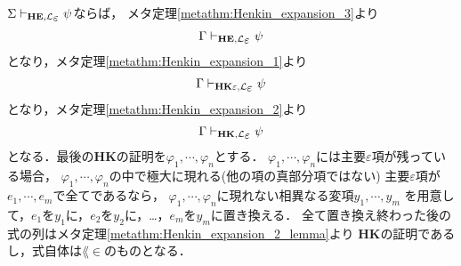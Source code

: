 	\begin{sketch}
		$\Sigma \provable{\mbox{{\bf HE}},\lang{\varepsilon}} \psi$ならば，
		メタ定理\ref{metathm:Henkin_expansion_3}より
		\begin{align}
			\Gamma \provable{\mbox{{\bf HE}},\lang{\varepsilon}} \psi
		\end{align}
		となり，メタ定理\ref{metathm:Henkin_expansion_1}より
		\begin{align}
			\Gamma \provable{\mbox{{\bf HK$\varepsilon$}},\lang{\varepsilon}} \psi
		\end{align}
		となり，メタ定理\ref{metathm:Henkin_expansion_2}より
		\begin{align}
			\Gamma \provable{\mbox{{\bf HK}},\lang{\varepsilon}} \psi
		\end{align}
		となる．最後の{\bf HK}の証明を$\varphi_{1},\cdots,\varphi_{n}$とする．
		$\varphi_{1},\cdots,\varphi_{n}$には主要$\varepsilon$項が残っている場合，
		$\varphi_{1},\cdots,\varphi_{n}$の中で極大に現れる(他の項の真部分項ではない)
		主要$\varepsilon$項が$e_{1},\cdots,e_{m}$で全てであるなら，
		$\varphi_{1},\cdots,\varphi_{n}$に現れない相異なる変項$y_{1},\cdots,y_{m}$
		を用意して，$e_{1}$を$y_{1}$に，$e_{2}$を$y_{2}$に，…，$e_{m}$を$y_{m}$に置き換える．
		全て置き換え終わった後の式の列はメタ定理\ref{metathm:Henkin_expansion_2_lemma}より
		{\bf HK}の証明であるし，式自体は$\lang{\in}$のものとなる．
		\QED
	\end{sketch}